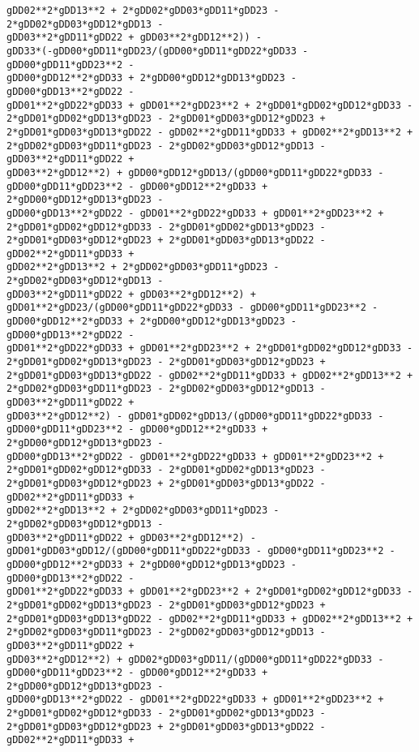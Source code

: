 \documentclass[landscape,letterpaper,10pt,english]{article}
\begin{document}
\begin{Verbatim}[commandchars=\\\{\}]
gDD02**2*gDD13**2 + 2*gDD02*gDD03*gDD11*gDD23 - 2*gDD02*gDD03*gDD12*gDD13 -
gDD03**2*gDD11*gDD22 + gDD03**2*gDD12**2)) -
gDD33*(-gDD00*gDD11*gDD23/(gDD00*gDD11*gDD22*gDD33 - gDD00*gDD11*gDD23**2 -
gDD00*gDD12**2*gDD33 + 2*gDD00*gDD12*gDD13*gDD23 - gDD00*gDD13**2*gDD22 -
gDD01**2*gDD22*gDD33 + gDD01**2*gDD23**2 + 2*gDD01*gDD02*gDD12*gDD33 -
2*gDD01*gDD02*gDD13*gDD23 - 2*gDD01*gDD03*gDD12*gDD23 +
2*gDD01*gDD03*gDD13*gDD22 - gDD02**2*gDD11*gDD33 + gDD02**2*gDD13**2 +
2*gDD02*gDD03*gDD11*gDD23 - 2*gDD02*gDD03*gDD12*gDD13 - gDD03**2*gDD11*gDD22 +
gDD03**2*gDD12**2) + gDD00*gDD12*gDD13/(gDD00*gDD11*gDD22*gDD33 -
gDD00*gDD11*gDD23**2 - gDD00*gDD12**2*gDD33 + 2*gDD00*gDD12*gDD13*gDD23 -
gDD00*gDD13**2*gDD22 - gDD01**2*gDD22*gDD33 + gDD01**2*gDD23**2 +
2*gDD01*gDD02*gDD12*gDD33 - 2*gDD01*gDD02*gDD13*gDD23 -
2*gDD01*gDD03*gDD12*gDD23 + 2*gDD01*gDD03*gDD13*gDD22 - gDD02**2*gDD11*gDD33 +
gDD02**2*gDD13**2 + 2*gDD02*gDD03*gDD11*gDD23 - 2*gDD02*gDD03*gDD12*gDD13 -
gDD03**2*gDD11*gDD22 + gDD03**2*gDD12**2) +
gDD01**2*gDD23/(gDD00*gDD11*gDD22*gDD33 - gDD00*gDD11*gDD23**2 -
gDD00*gDD12**2*gDD33 + 2*gDD00*gDD12*gDD13*gDD23 - gDD00*gDD13**2*gDD22 -
gDD01**2*gDD22*gDD33 + gDD01**2*gDD23**2 + 2*gDD01*gDD02*gDD12*gDD33 -
2*gDD01*gDD02*gDD13*gDD23 - 2*gDD01*gDD03*gDD12*gDD23 +
2*gDD01*gDD03*gDD13*gDD22 - gDD02**2*gDD11*gDD33 + gDD02**2*gDD13**2 +
2*gDD02*gDD03*gDD11*gDD23 - 2*gDD02*gDD03*gDD12*gDD13 - gDD03**2*gDD11*gDD22 +
gDD03**2*gDD12**2) - gDD01*gDD02*gDD13/(gDD00*gDD11*gDD22*gDD33 -
gDD00*gDD11*gDD23**2 - gDD00*gDD12**2*gDD33 + 2*gDD00*gDD12*gDD13*gDD23 -
gDD00*gDD13**2*gDD22 - gDD01**2*gDD22*gDD33 + gDD01**2*gDD23**2 +
2*gDD01*gDD02*gDD12*gDD33 - 2*gDD01*gDD02*gDD13*gDD23 -
2*gDD01*gDD03*gDD12*gDD23 + 2*gDD01*gDD03*gDD13*gDD22 - gDD02**2*gDD11*gDD33 +
gDD02**2*gDD13**2 + 2*gDD02*gDD03*gDD11*gDD23 - 2*gDD02*gDD03*gDD12*gDD13 -
gDD03**2*gDD11*gDD22 + gDD03**2*gDD12**2) -
gDD01*gDD03*gDD12/(gDD00*gDD11*gDD22*gDD33 - gDD00*gDD11*gDD23**2 -
gDD00*gDD12**2*gDD33 + 2*gDD00*gDD12*gDD13*gDD23 - gDD00*gDD13**2*gDD22 -
gDD01**2*gDD22*gDD33 + gDD01**2*gDD23**2 + 2*gDD01*gDD02*gDD12*gDD33 -
2*gDD01*gDD02*gDD13*gDD23 - 2*gDD01*gDD03*gDD12*gDD23 +
2*gDD01*gDD03*gDD13*gDD22 - gDD02**2*gDD11*gDD33 + gDD02**2*gDD13**2 +
2*gDD02*gDD03*gDD11*gDD23 - 2*gDD02*gDD03*gDD12*gDD13 - gDD03**2*gDD11*gDD22 +
gDD03**2*gDD12**2) + gDD02*gDD03*gDD11/(gDD00*gDD11*gDD22*gDD33 -
gDD00*gDD11*gDD23**2 - gDD00*gDD12**2*gDD33 + 2*gDD00*gDD12*gDD13*gDD23 -
gDD00*gDD13**2*gDD22 - gDD01**2*gDD22*gDD33 + gDD01**2*gDD23**2 +
2*gDD01*gDD02*gDD12*gDD33 - 2*gDD01*gDD02*gDD13*gDD23 -
2*gDD01*gDD03*gDD12*gDD23 + 2*gDD01*gDD03*gDD13*gDD22 - gDD02**2*gDD11*gDD33 +

\end{Verbatim}
\end{document}
